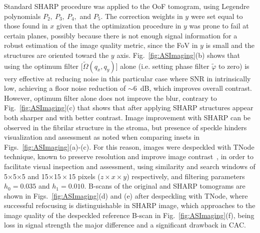 Standard SHARP procedure was applied to the OoF tomogram, using Legendre polynomials $P_2,\ P_3,\ P_4,$ and $P_5$. The correction weights in $y$ were set equal to those found in $x$ given that the optimization procedure in $y$ was prone to fail at certain planes, possibly because there is not enough signal information for a robust estimation of the image quality metric, since the FoV in $y$ is small and the structures are oriented toward the $y$ axis. Fig.~\ref{fig:ASImaging}(b) shows that using the optimum filter [$\tilde{\Omega}(q_x,q_y)$] alone (i.e. setting phase filter $\tilde{\varphi}$ to zero) is very effective at reducing noise in this particular case where SNR in intrinsically low, achieving a floor noise reduction of $\sim$6~dB, which improves overall contrast. However, optimum filter alone does not improve the blur, contrary to Fig.~\ref{fig:ASImaging}(c) that shows that after applying SHARP structures appear both sharper and with better contrast. Image improvement with SHARP can be observed in the fibrilar structure in the stroma, but presence of speckle hinders visualization and assessment as noted when comparing insets in Figs.~\ref{fig:ASImaging}(a)-(c). For this reason, images were despeckled with TNode technique, known to preserve resolution and improve image contrast~\cite{Cuartas-Velez2018_Volumetric}, in order to facilitate visual inspection and assessment, using similarity and search windows of 5$\times$5$\times$5 and 15$\times$1$5\times$15 pixels ($z\times x\times y$) respectively, and filtering parameters $h_0 = 0.035$ and $h_1 = 0.010$. B-scans of the original and SHARP tomograms are shown in Figs.~\ref{fig:ASImaging}(d) and (e) after despeckling with TNode, where successful refocusing is distinguishable in SHARP image, which approaches to the image quality of the despeckled reference B-scan in Fig.~\ref{fig:ASImaging}(f), being loss in signal strength the major difference and a significant drawback in CAC.

